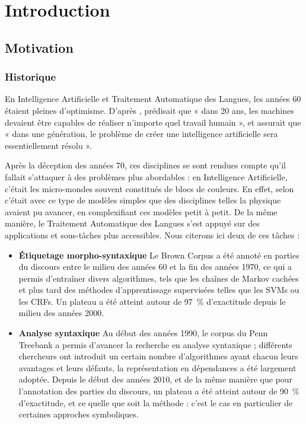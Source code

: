 \chapter{Introduction}
\label{ch:intro}

\section{Motivation}

\subsection{Historique}

En Intelligence Artificielle et Traitement Automatique des Langues, les années
60 étaient pleines d'optimisme. D'après \citep{crevier1993ai},
\cite{simon1965shape} prédisait que « dans 20 ans, les machines devaient être
capables de réaliser n'importe quel travail humain », et
\cite{minsky1967computation} assurait que « dans une génération, le problème de
créer une intelligence artificielle sera essentiellement résolu ».


Après la déception des années 70, ces disciplines se sont rendues compte qu'il
fallait s'attaquer à des problèmes plus abordables : en Intelligence
Artificielle, c'était les micro-mondes souvent constitués de blocs de couleurs.
En effet, selon \citep{russell2009artificial} c'était avec ce type de modèles
simples que des disciplines telles la physique avaient pu avancer, en
complexifiant ces modèles petit à petit. De la même manière, le Traitement
Automatique des Langues s'est appuyé sur des applications et sous-tâches plus
accessibles. Nous citerons ici deux de ces tâches :

\begin{itemize}
    \item \textbf{Étiquetage morpho-syntaxique} Le Brown Corpus a été annoté en
    parties du discours entre le milieu des années 60 et la fin des années
    1970, ce qui a permis d'entraîner divers algorithmes, tels que les chaînes
    de Markov cachées et plus tard des méthodes d'apprentissage supervisées
    telles que les SVMs ou les CRFs. Un plateau a été atteint autour de 97~\%
    d'exactitude depuis le milieu des années 2000.
    \item \textbf{Analyse syntaxique} Au début des années 1990, le corpus du
    Penn Treebank \citep{marcus1993building} a permis d'avancer la recherche en
    analyse syntaxique ; différents chercheurs ont introduit un certain nombre
    d'algorithmes ayant chacun leurs avantages et leurs défauts, la
    représentation en dépendances a été largement adoptée. Depuis le début des
    années 2010, et de la même manière que pour l'annotation des parties du
    discours, un plateau a été atteint autour de 90~\% d'exactitude, et ce
    quelle que soit la méthode : c'est le cas en particulier de certaines
    approches symboliques.
\end{itemize}


